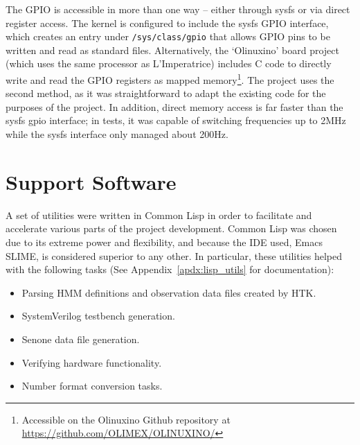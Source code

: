 		The GPIO is accessible in more than one way -- either through sysfs or via direct register access.  The kernel is configured to include the sysfs GPIO interface, which creates an entry under \texttt{/sys/class/gpio} that allows GPIO pins to be written and read as standard files.  Alternatively, the `Olinuxino' board project (which uses the same processor as L'Imperatrice) includes C code to directly write and read the GPIO registers as mapped memory\footnote{Accessible on the Olinuxino Github repository at \href{https://github.com/OLIMEX/OLINUXINO/}{https://github.com/OLIMEX/OLINUXINO/}}.  The project uses the second method, as it was straightforward to adapt the existing code for the purposes of the project.  In addition, direct memory access is far faster than the sysfs gpio interface; in tests, it was capable of switching frequencies up to 2MHz while the sysfs interface only managed about 200Hz.





\section{Support Software} %
\label{sec:support_software}
	A set of utilities were written in Common Lisp in order to facilitate and accelerate various parts of the project development.  Common Lisp was chosen due to its extreme power and flexibility, and because the IDE used, Emacs SLIME, is considered superior to any other.  In particular, these utilities helped with the following tasks (See Appendix~\ref{apdx:lisp_utils} for documentation):
	\begin{itemize}
		\item Parsing HMM definitions and observation data files created by HTK.
		\item SystemVerilog testbench generation.
		\item Senone data file generation.
		\item Verifying hardware functionality.
		\item Number format conversion tasks.
	\end{itemize}

